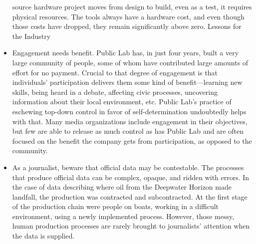 \begin{itemize}
source hardware project moves from design to build, even as a test,
it requires physical resources. The tools always have a hardware cost,
and even though those costs have dropped, they remain significantly
above zero.
Lessons for the Industry
\item Engagement needs benefit.
Public Lab has, in just four years, built a very large community of
people, some of whom have contributed large amounts of effort for
no payment. Crucial to that degree of engagement is that individuals'
participation delivers them some kind of benefit—learning new skills,
being heard in a debate, affecting civic processes, uncovering information
about their local environment, etc. Public Lab's practice of
eschewing top-down control in favor of self-determination undoubtedly
helps with that. Many media organizations include engagement
in their objectives, but few are able to release as much control as has
Public Lab and are often focused on the benefit the company gets
from participation, as opposed to the community.
\item As a journalist, beware that official data may be contestable.
The processes that produce official data can be complex, opaque, and
ridden with errors. In the case of data describing where oil from the
Deepwater Horizon made landfall, the production was contracted and
subcontracted. At the first stage of the production chain were people
on boats, working in a difficult environment, using a newly implemented
process. However, those messy, human production processes
are rarely brought to journalists' attention when the data is supplied.
\end{itemize}


